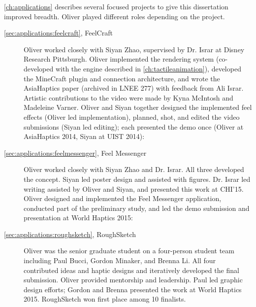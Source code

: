 \noindent
\autoref{ch:applications} describes several focused projects to give this dissertation improved breadth.
Oliver played different roles depending on the project.
\begin{description}

\item[\autoref{sec:applications:feelcraft}, FeelCraft] Oliver worked closely with Siyan Zhao, supervised by Dr. Israr at Disney Research Pittsburgh.
Oliver implemented the rendering system (co-developed with the engine described in \autoref{ch:tactileanimation}), developed the MineCraft plugin and connection architecture, and wrote the AsiaHaptics paper (archived in LNEE 277) with feedback from Ali Israr.
Artistic contributions to the video were made by Kyna McIntosh and Madeleine Varner.
Oliver and Siyan together designed the implemented feel effects (Oliver led implementation), planned, shot, and edited the video submissions (Siyan led editing); each presented the demo once (Oliver at AsiaHaptics 2014, Siyan at UIST 2014):



\item[\autoref{sec:applications:feelmessenger}, Feel Messenger] Oliver worked closely with Siyan Zhao and Dr. Israr.
All three developed the concept.
Siyan led poster design and assisted with figures.
Dr. Israr led writing assisted by Oliver and Siyan, and presented this work at CHI'15.
Oliver designed and implemented the Feel Messenger application, conducted part of the preliminary study, and led the demo submission and presentation at World Haptics 2015:


\item[\autoref{sec:applications:roughsketch}, RoughSketch] Oliver was the senior graduate student on a four-person student team including Paul Bucci, Gordon Minaker, and Brenna Li.
All four contributed ideas and haptic designs and iteratively developed the final submission.
Oliver provided mentorship and leadership.
Paul led graphic design efforts; Gordon and Brenna presented the work at World Haptics 2015.
RoughSketch won first place among 10 finalists.


\end{description}
